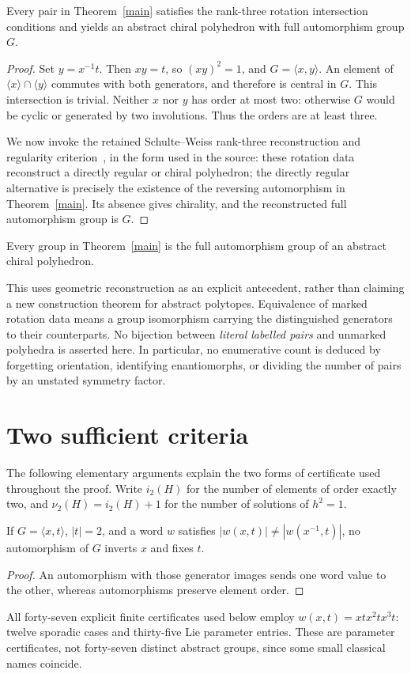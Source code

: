 \documentclass[11pt,a4paper]{article}
\newcommand{\ii}{i_2}\newcommand{\nuu}{\nu_2}
\begin{document}
\begin{lemma}\label{geometry}
Every pair in Theorem~\ref{main} satisfies the rank-three rotation
intersection conditions and yields an abstract chiral polyhedron with
full automorphism group $G$.
\end{lemma}
\begin{proof}
Set $y=x^{-1}t$. Then $xy=t$, so $(xy)^2=1$, and
$G=\langle x,y\rangle$. An element of
$\langle x\rangle\cap\langle y\rangle$ commutes with both generators,
and therefore is central in $G$. This intersection is trivial.
Neither $x$ nor $y$ has order at most two: otherwise $G$ would be cyclic
or generated by two involutions. Thus the orders are at least three.

We now invoke the retained Schulte--Weiss rank-three reconstruction
and regularity criterion~\cite{SW}, in the form used in the source:
these rotation data reconstruct a directly regular or chiral polyhedron;
the directly regular alternative is precisely the existence of the
reversing automorphism in Theorem~\ref{main}. Its absence gives chirality,
and the reconstructed full automorphism group is $G$.
\end{proof}
\begin{corollary}\label{polyhedra}
Every group in Theorem~\ref{main} is the full automorphism group of an
abstract chiral polyhedron.
\end{corollary}
This uses geometric reconstruction as an explicit antecedent, rather
than claiming a new construction theorem for abstract polytopes.
Equivalence of marked rotation data means a group isomorphism carrying
the distinguished generators to their counterparts. No bijection between
\emph{literal labelled pairs} and unmarked polyhedra is asserted here.
In particular, no enumerative count is deduced by forgetting orientation,
identifying enantiomorphs, or dividing the number of pairs by an unstated
symmetry factor.

\section{Two sufficient criteria}
The following elementary arguments explain the two forms of certificate
used throughout the proof. Write $\ii(H)$ for the number of elements of
order exactly two, and $\nuu(H)=\ii(H)+1$ for the number of solutions of
$h^2=1$.
\begin{lemma}\label{word}
If $G=\langle x,t\rangle$, $|t|=2$, and a word $w$ satisfies
$|w(x,t)|\ne|w(x^{-1},t)|$, no automorphism of $G$ inverts $x$ and fixes $t$.
\end{lemma}
\begin{proof}
An automorphism with those generator images sends one word value to the
other, whereas automorphisms preserve element order.
\end{proof}
All forty-seven explicit finite certificates used below employ
$w(x,t)=xtx^2tx^3t$: twelve sporadic cases and thirty-five Lie parameter
entries. These are parameter certificates, not forty-seven distinct
abstract groups, since some small classical names coincide.
\end{document}
